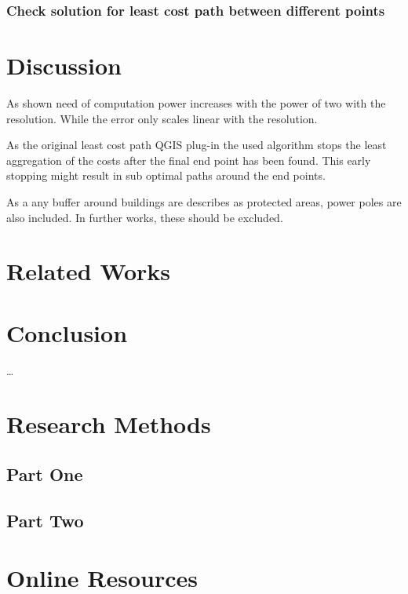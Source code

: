 \documentclass[acmtog]{acmart}
\begin{document}
	\subsubsection{Check solution for least cost path between different points}
	
	\section{Discussion}\label{sec:discussion}
	As shown need of computation power increases with the power of two with the resolution.
	While the error only scales linear with the resolution.
	
	As the original least cost path QGIS plug-in the used algorithm stops the least aggregation of the costs after the final end point has been found.
	This early stopping might result in sub optimal paths around the end points.
	
	As a any buffer around buildings are describes as protected areas, power poles are also included.
	In further works, these should be excluded.
	
	\section{Related Works}\label{sec:related-works}


	\section{Conclusion}\label{sec:conclusion}



	\begin{acks}
	\ldots
   	\end{acks}





\appendix

\section{Research Methods}\label{sec:research-methods}

	\subsection{Part One}\label{subsec:part-one}

	\subsection{Part Two}\label{subsec:part-two}


	\section{Online Resources}\label{sec:online-resources}
\end{document}

